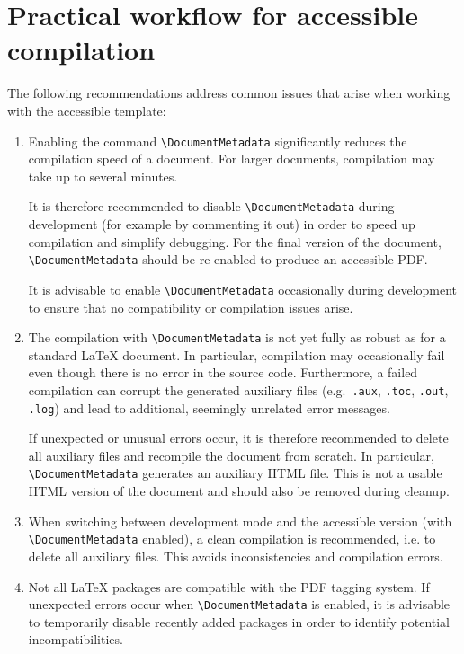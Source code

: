 \section{Practical workflow for accessible compilation}
\label{sec:practical_advice}

The following recommendations address common issues that arise when working with the accessible template:

\begin{enumerate}
\item 
Enabling the command \verb|\DocumentMetadata| significantly reduces the compilation speed of a document. For larger documents, compilation may take up to several minutes.

It is therefore recommended to disable \verb|\DocumentMetadata| during development (for example by commenting it out) in order to speed up compilation and simplify debugging. For the final version of the document, \verb|\DocumentMetadata| should be re‑enabled to produce an accessible PDF.

It is advisable to enable \verb|\DocumentMetadata| occasionally during development to ensure that no compatibility or compilation issues arise.

\item
The compilation with \verb|\DocumentMetadata| is not yet fully as robust as for a standard \LaTeX{} document. In particular, compilation may occasionally fail even though there is no error in the source code. Furthermore, a failed compilation can corrupt the generated auxiliary files (e.g.\ \texttt{.aux}, \texttt{.toc}, \texttt{.out}, \texttt{.log}) and lead to additional, seemingly unrelated error messages.

If unexpected or unusual errors occur, it is therefore recommended to delete all auxiliary files and recompile the document from scratch. In particular, \verb|\DocumentMetadata| generates an auxiliary HTML file. This is not a usable HTML version of the document and should also be removed during cleanup.
\item
When switching between development mode and the accessible version (with \verb|\DocumentMetadata| enabled), a clean compilation is recommended, i.e. to delete all auxiliary files. 
This avoids inconsistencies and compilation errors.
\item
Not all \LaTeX{} packages are compatible with the PDF tagging system. 
If unexpected errors occur when \verb|\DocumentMetadata| is enabled, it is advisable to temporarily disable recently added packages in order to identify potential incompatibilities.


\end{enumerate}

